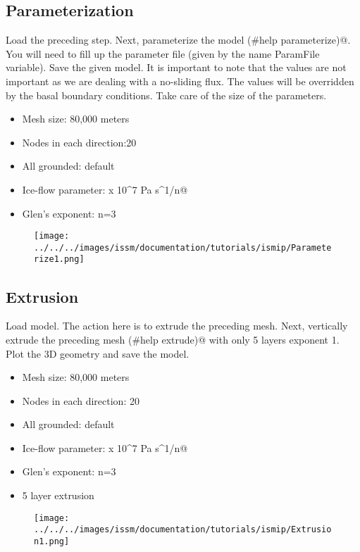 \subsection{Parameterization} %
Load the preceding step. Next, parameterize the model \verb@(#help parameterize)@. You will need to fill up the parameter file (given by the name ParamFile variable). Save the given model. It is important to note that the values are not important as we are dealing with a no-sliding flux. The values will be overridden by the basal boundary conditions. Take care of the size of the parameters.
\begin{itemize}
	\item Mesh size: 80,000 meters
	\item Nodes in each direction:20
	\item All grounded: default
	\item Ice-flow parameter:  x 10^7 Pa s^1/n@
	\item Glen's exponent: n=3
\end{itemize}
\begin{figure}[H]
	\begin{center}
		\texttt{[image: ../../../images/issm/documentation/tutorials/ismip/Parameterize1.png]}
	\end{center}
\end{figure}
\subsection{Extrusion} %
Load \verb@Parameterization@ model. The action here is to extrude the preceding mesh. Next, vertically
extrude the preceding mesh \verb@(#help extrude)@ with only 5 layers exponent 1. Plot the 3D
geometry and save the model.
\begin{itemize}
	\item Mesh size: 80,000 meters
	\item Nodes in each direction: 20
	\item All grounded: default
	\item Ice-flow parameter:  x 10^7 Pa s^1/n@
	\item Glen's exponent: n=3
	\item 5 layer extrusion
\end{itemize}
\begin{figure}[H]
	\begin{center}
		\texttt{[image: ../../../images/issm/documentation/tutorials/ismip/Extrusion1.png]}
	\end{center}
\end{figure}
